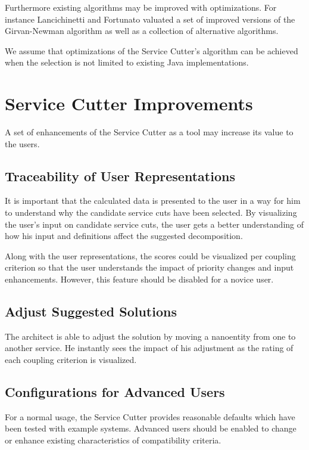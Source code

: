 Furthermore existing algorithms may be improved with optimizations. For instance Lancichinetti and Fortunato\cite{lancichinetti2009community} valuated a set of improved versions of the Girvan-Newman algorithm as well as a collection of alternative algorithms.

We assume that optimizations of the Service Cutter's algorithm can be achieved when the selection is not limited to existing Java implementations.

\section{Service Cutter Improvements}

A set of enhancements of the Service Cutter as a tool may increase its value to the users.

\subsection{Traceability of User Representations}

It is important that the calculated data is presented to the user in a way for him to understand why the candidate service cuts have been selected. By visualizing the user's input on candidate service cuts, the user gets a better understanding of how his input and definitions affect the suggested decomposition. 

Along with the user representations, the scores could be visualized per coupling criterion so that the user understands the impact of priority changes and input enhancements. However, this feature should be disabled for a novice user. 

\subsection{Adjust Suggested Solutions}

The architect is able to adjust the solution by moving a nanoentity from one to another service. He instantly sees the impact of his adjustment as the rating of each coupling criterion is visualized.

\subsection{Configurations for Advanced Users}

For a normal usage, the Service Cutter provides reasonable defaults which have been tested with example systems. Advanced users should be enabled to change or enhance existing characteristics of compatibility criteria.

